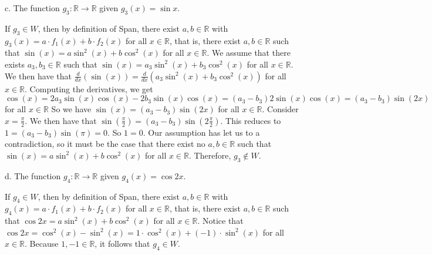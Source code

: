 \documentclass[12pt]{article}
\newenvironment{problem}[2][Problem]
{
	\begin{trivlist} 
		\item[\hskip \labelsep {\bfseries #1 #2:}]
	}
{
	\end{trivlist}
	}
\newenvironment{solution}[1][Solution]
{
	\begin{trivlist} 
		\item[\hskip \labelsep {\itshape #1:}]
	}
	{
	\end{trivlist}
}
\begin{document}
\begin{problem}{4}
\noindent
\newline
\newline
c. The function $g_3 : \mathbb{R} \to \mathbb{R}$ given $g_3 (x) = \sin x$.
\begin{solution}
If $g_3 \in W$, then by definition of Span, there exist $a,b \in \mathbb{R}$ with $g_3(x) = a\cdot f_1(x) + b\cdot f_2(x)$ for all $x\in \mathbb{R}$, that is, there exist $a,b \in \mathbb{R}$ such that $\sin (x) = a\sin ^2 (x) + b\cos ^2 (x)$ for all $x \in \mathbb{R}$. We assume that there exists $a_3, b_3 \in \mathbb{R}$ such that $\sin (x) = a_3 \sin ^2 (x) + b_3 \cos ^2 (x)$ for all $x \in \mathbb{R}$. We then have that $\frac{d}{dx} (\sin (x)) = \frac{d}{dx} (a_3 \sin ^2 (x) + b_3 \cos ^2 (x))$ for all $x \in \mathbb{R}$. Computing the derivatives, we get $\cos(x) = 2a_3 \sin (x) \cos (x) - 2b_3 \sin (x) \cos (x) = (a_3 - b_3) 2 \sin(x) \cos(x) =(a_3 - b_3) \sin (2x)$ for all $x \in \mathbb{R}$ So we have $\sin (x) = (a_3 - b_3) \sin (2x)$ for all $x \in \mathbb{R}$. Consider $x=\frac{\pi}{2}$. We then have that $\sin (\frac{\pi}{2}) = (a_3 - b_3) \sin (2 \frac{\pi}{2})$. This reduces to $1 = (a_3 - b_3) \sin (\pi) = 0$. So $1=0$. Our assumption has let us to a contradiction, so it must be the case that there exist no $a,b \in \mathbb{R}$ such that $\sin (x) = a\sin ^2 (x) + b\cos ^2 (x)$ for all $x \in \mathbb{R}$. Therefore, $g_3 \notin W$.
\end{solution}
\noindent
\newline
\newline
d. The function $g_4 : \mathbb{R} \to \mathbb{R}$ given $g_4 (x) = \cos 2x$.
\begin{solution}
If $g_4 \in W$, then by definition of Span, there exist $a,b \in \mathbb{R}$ with $g_4(x) = a\cdot f_1(x) + b\cdot f_2(x)$ for all $x\in \mathbb{R}$, that is, there exist $a,b \in \mathbb{R}$ such that $\cos 2x = a\sin ^2 (x) + b\cos ^2 (x)$ for all $x \in \mathbb{R}$. Notice that $\cos 2x = \cos ^2 (x) - \sin ^2 (x) = 1\cdot \cos ^2 (x) + (-1) \cdot \sin ^2 (x)$ for all $x \in \mathbb{R}$. Because $1,-1\in \mathbb{R}$, it follows that $g_4 \in W$.

\end{solution}
\end{problem}
\end{document}
